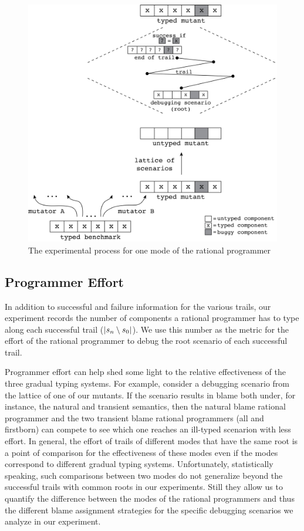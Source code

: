 \begin{figure}
  \centering
  \includegraphics[scale=0.36]{./Images/process}
  \caption{The experimental process for one mode of the rational
  programmer}
  \label{fig:process}
\end{figure}


\subsection{Programmer Effort}

In addition to successful and failure information for the various trails,  
our experiment  records the number of components a rational programmer 
has to type along each successful trail ($\lvert s_n \setminus s_0
\rvert$). We use this number as the metric for the effort 
of the rational programmer to debug the root scenario of each successful trail.  

Programmer effort can help shed some light to the relative effectiveness of the
three gradual typing systems. For example, consider a debugging scenario from  the
lattice of one of our mutants.  If the
scenario results in blame both under, for instance, the natural and transient semantics,
then the natural blame rational programmer and the two transient blame
rational programmers (all and firstborn) can compete to see which one
reaches an ill-typed scenarion with less effort. In
general, the effort of trails of different modes that have the same
root is a point of comparison for the effectiveness of these
modes even if the modes correspond to different gradual typing systems.
Unfortunately, statistically speaking, such comparisons between two modes do not generalize 
beyond the successful trails with common roots in our experiments.
Still they allow us to quantify the difference between the modes of the rational
programmers and thus the different blame assignment strategies  for the specific
debugging scenarios we analyze in our experiment.
